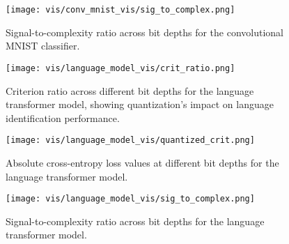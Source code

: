 \documentclass[twocolumn]{article}
\begin{document}
\begin{figure}[htbp]
\centering
\texttt{[image: vis/conv\_mnist\_vis/sig\_to\_complex.png]}
\caption{Signal-to-complexity ratio across bit depths for the convolutional MNIST classifier.}
\label{fig:conv_mnist_scr}
\end{figure}
\begin{figure}[htbp]
\centering
\texttt{[image: vis/language\_model\_vis/crit\_ratio.png]}
\caption{Criterion ratio across different bit depths for the language transformer model, showing quantization's impact on language identification performance.}
\label{fig:lang_model_cr}
\end{figure}
\begin{figure}[htbp]
\centering
\texttt{[image: vis/language\_model\_vis/quantized\_crit.png]}
\caption{Absolute cross-entropy loss values at different bit depths for the language transformer model.}
\label{fig:lang_model_qc}
\end{figure}
\begin{figure}[htbp]
\centering
\texttt{[image: vis/language\_model\_vis/sig\_to\_complex.png]}
\caption{Signal-to-complexity ratio across bit depths for the language transformer model.}
\label{fig:lang_model_scr}
\end{figure}
\end{document}
